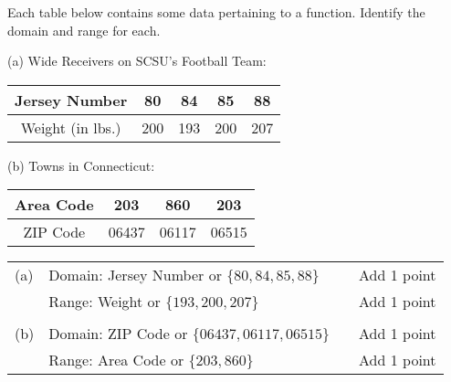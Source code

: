 {
	Each table below contains some data pertaining to a function.  Identify the domain and range for each. 

\bigskip\noindent (a) Wide Receivers on SCSU's Football Team:

\noindent \begin{tabular}{|c|c|c|c|c|}\hline Jersey Number & 80&84&85&88\\ \hline Weight (in lbs.)&200&193&200&207\\ \hline
\end{tabular}

\bigskip\noindent (b) Towns in Connecticut:

\noindent \begin{tabular}{|c|c|c|c|}\hline Area Code & 203&860&203\\ \hline ZIP Code &06437&06117&06515\\ \hline

\end{tabular}}
{\begin{tabular}{llll}
 (a) &Domain: Jersey Number or $\{80,84,85,88\}$ &&Add 1 point\\
&Range: Weight or $\{193,200,207\}$ &&Add 1 point\\ &&&\\
(b)&Domain: ZIP Code or $\{06437,06117,06515\}$ &&Add 1 point\\
&Range: Area Code or $\{203,860\}$ &&Add 1 point\\ 
\end{tabular}}





